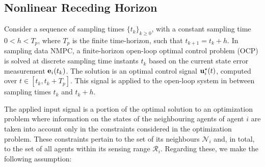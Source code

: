 \subsection{Nonlinear Receding Horizon}

Consider a sequence of sampling times $\{t_k\}_{k \geq 0}$, with a constant
sampling time $0 < h < T_p$, where $T_p$ is the finite time-horizon, such that
$t_{k+1} = t_k + h$. In sampling data NMPC, a finite-horizon open-loop optimal
control problem (OCP) is solved at discrete sampling time instants $t_k$
based on the current state error measurement $\bm{\mathbf{e}}_i(t_k)$. The solution
is an optimal control signal $\bm{\mathbf{u}}_i^{\star}(t)$, computed over
$t \in [t_k, t_k+T_p]$. This signal is applied to the open-loop system in
between sampling times $t_k$ and $t_k + h$.

The applied input signal is a
portion of the optimal solution to an optimization problem where information on
the states of the neighbouring agents of agent $i$ are taken into account only
in the constraints considered in the optimization problem. These constraints
pertain to the set of its neighbours $\mathcal{N}_i$ and, in total, to the
set of all agents within its sensing range $\mathcal{R}_i$. Regarding these, we
make the following assumption:

